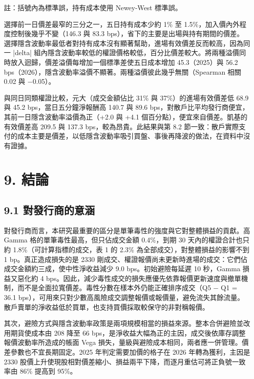 \documentclass[12pt,a4paper]{article}
\begin{document}
{\small\noindent 註：括號內為標準誤，持有成本使用 Newey-West 標準誤。\par}

選擇前一日價差最窄的三分之一，五日持有成本少約 1\% 至 1.5\%，加入價內外程度控制後幾乎不變（146.3 與 83.3 bps），省下的主要是出場與持有期間的價差。選擇隱含波動率最低者對持有成本沒有顯著幫助，進場有效價差反而較高，因為同一 |delta| 組內隱含波動率較低的權證價格較低，百分比價差較大。將兩種溢價同時放入迴歸，價差溢價每增加一個標準差使五日成本增加 45.3（2025）與 56.2 bps（2026），隱含波動率溢價不顯著。兩種溢價彼此幾乎無關（Spearman 相關 0.02 與 −0.05）。

與同日同類權證比較，元大（成交金額佔比 31\% 與 37\%）的進場有效價差低 68.9 與 45.2 bps，當日五分鐘淨報酬高 140.7 與 89.6 bps，對散戶比平均發行商便宜，其前一日隱含波動率溢價為正（+2.0 與 +4.1 個百分點），便宜來自價差。凱基的有效價差高 209.5 與 137.3 bps，較為昂貴。此結果與第 8.2 節一致：散戶實際支付的成本主要是價差，以低隱含波動率吸引買盤、事後再降波的做法，在資料中沒有證據。


\section*{9. 結論}

\subsection*{9.1 對發行商的意涵}

對發行商而言，本研究最重要的區分是單筆毒性的強度與它對整體損益的貢獻。高 Gamma 格的單筆毒性最高，但只佔成交金額 0.4\%，到期 30 天內的權證合計也只約 1.8\%（可計算指標的成交，表 1 的 2.3\% 為全部成交），對整體損益的影響不到 1 bp。真正造成損失的是 2330 剛成交、權證報價尚未更新時進場的成交：它們佔成交金額約三成，使中性淨收益減少 9.0 bps。初始避險每延遲 10 秒，Gamma 損益又惡化約 4 bps。因此，減少毒性成交的損失應優先依靠報價更新速度與撤單機制，而不是全面拉寬價差。毒性分數在樣本外仍能正確排序成交（Q5 − Q1 = 36.1 bps），可用來只對少數高風險成交調整報價或報價量，避免流失其餘流量。散戶賣單的淨收益低於買單，也支持買價採取較保守的非對稱報價。

其次，避險方式與隱含波動率政策是兩項規模相當的損益來源。整本合併避險並改用期貨使成本由 208 降至 66 bps，是淨收益大幅為正的主因，成交後依庫存調整報價波動率所造成的帳面 Vega 損失，量級與避險成本相同，兩者應一併管理。價差參數也不宜長期固定。2025 年判定需要加價的格子在 2026 年轉為獲利，主因是 2330 股價上升使現股相對價差縮小、損益兩平下降，而逐月重估可將正負號一致率由 86\% 提高到 95\%。
\end{document}
